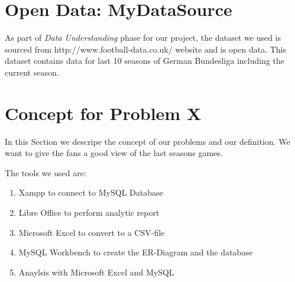 \documentclass[11pt, journal]{IEEEtran}
\begin{document}
\section{Open Data: MyDataSource} \label{sec:dataunderstanding}
As part of \emph{Data Understanding}  phase for our project, the dataset we used is sourced from http://www.football-data.co.uk/ website and is open data. This dataset contains data for last 10 seasons of German Bundesliga including the current season.
\section{Concept for Problem X} \label{sec:concept}
In this Section we descripe the concept of our problems and our definition.
We want to give the fans a good view of the last seasons games.

The tools we used are: 
\begin{enumerate}
	\item Xampp to connect to MySQL Database
\item Libre Office to perform analytic report
\item Microsoft Excel to convert to a CSV-file
\item MySQL Workbench to create the ER-Diagram and the database
\item Anaylsis with Microsoft Excel and MySQL
\end{enumerate}
 
\end{document}
